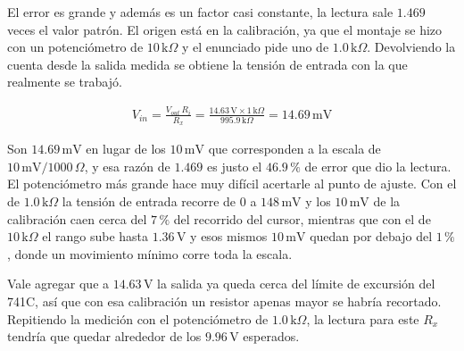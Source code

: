 \documentclass[11pt]{article}
\begin{document}
El error es grande y además es un factor casi constante, la lectura sale $1.469$ veces el valor patrón. El origen está en la calibración, ya que el montaje se hizo con un potenciómetro de $10\,\text{k}\Omega$ y el enunciado pide uno de $1.0\,\text{k}\Omega$. Devolviendo la cuenta desde la salida medida se obtiene la tensión de entrada con la que realmente se trabajó.

\begin{align*}
V_{in} = \frac{V_{out}\,R_i}{R_x} = \frac{14.63\,\text{V} \times 1\,\text{k}\Omega}{995.9\,\text{k}\Omega} = 14.69\,\text{mV}
\end{align*}

Son $14.69\,\text{mV}$ en lugar de los $10\,\text{mV}$ que corresponden a la escala de $10\,\text{mV}/1000\,\Omega$, y esa razón de $1.469$ es justo el $46.9\,\%$ de error que dio la lectura. El potenciómetro más grande hace muy difícil acertarle al punto de ajuste. Con el de $1.0\,\text{k}\Omega$ la tensión de entrada recorre de $0$ a $148\,\text{mV}$ y los $10\,\text{mV}$ de la calibración caen cerca del $7\,\%$ del recorrido del cursor, mientras que con el de $10\,\text{k}\Omega$ el rango sube hasta $1.36\,\text{V}$ y esos mismos $10\,\text{mV}$ quedan por debajo del $1\,\%$, donde un movimiento mínimo corre toda la escala.

Vale agregar que a $14.63\,\text{V}$ la salida ya queda cerca del límite de excursión del 741C, así que con esa calibración un resistor apenas mayor se habría recortado. Repitiendo la medición con el potenciómetro de $1.0\,\text{k}\Omega$, la lectura para este $R_x$ tendría que quedar alrededor de los $9.96\,\text{V}$ esperados.
\end{document}
